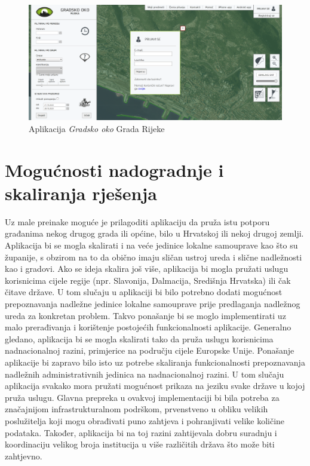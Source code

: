 		\begin{figure}[H]
			\includegraphics[width=\textwidth]{slike/GradskoOko.PNG}
			\caption{Aplikacija \textit{Gradsko oko} Grada Rijeke}
			\label{fig:gradskooko} %
		\end{figure}
		
		\eject
		
		\section{Mogućnosti nadogradnje i skaliranja rješenja} 
		
		Uz male preinake moguće je prilagoditi aplikaciju da pruža istu potporu građanima nekog drugog grada ili općine, bilo u Hrvatskoj ili nekoj drugoj zemlji. Aplikacija bi se mogla skalirati i na veće jedinice lokalne samouprave kao što su županije, s obzirom na to da obično imaju sličan ustroj ureda i slične nadležnosti kao i gradovi. Ako se ideja skalira još više, aplikacija bi mogla pružati uslugu korisnicima cijele regije (npr. Slavonija, Dalmacija, Središnja Hrvatska) ili čak čitave države. U tom slučaju u aplikaciji bi bilo potrebno dodati mogućnost prepoznavanja nadležne jedinice lokalne samouprave prije predlaganja nadležnog ureda za konkretan problem. Takvo ponašanje bi se moglo implementirati uz malo prerađivanja i korištenje postojećih funkcionalnosti aplikacije. Generalno gledano, aplikacija bi se mogla skalirati tako da pruža uslugu korisnicima nadnacionalnoj razini, primjerice na području cijele Europske Unije. Ponašanje aplikacije bi zapravo bilo isto uz potrebe skaliranja funkcionalnosti prepoznavanja nadležnih administrativnih jedinica na nadnacionalnoj razini. U tom slučaju aplikacija svakako mora pružati mogućnost prikaza na jeziku svake države u kojoj pruža uslugu. Glavna prepreka u ovakvoj implementaciji bi bila potreba za značajnijom infrastrukturalnom podrškom, prvenstveno u obliku velikih poslužitelja koji mogu obrađivati puno zahtjeva i pohranjivati velike količine podataka. Također, aplikacija bi na toj razini zahtijevala dobru suradnju i koordinaciju velikog broja institucija u više različitih država što može biti zahtjevno.
		
		\eject
		
